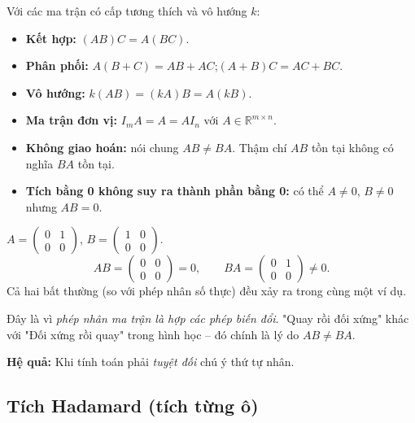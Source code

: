 \documentclass[12pt,a4paper]{article}
\begin{document}
\begin{tinhchat}[title={Tính chất phép nhân ma trận}]
Với các ma trận có cấp tương thích và vô hướng $k$:
\begin{itemize}
  \item \textbf{Kết hợp:} $(AB)C = A(BC)$.
  \item \textbf{Phân phối:} $A(B + C) = AB + AC$;\quad $(A+B)C = AC + BC$.
  \item \textbf{Vô hướng:} $k(AB) = (kA)B = A(kB)$.
  \item \textbf{Ma trận đơn vị:} $I_m A = A = A I_n$ với $A \in \mathbb{R}^{m \times n}$.
  \item \textbf{Không giao hoán:} nói chung $AB \ne BA$. Thậm chí $AB$ tồn tại không có nghĩa $BA$ tồn tại.
  \item \textbf{Tích bằng 0 không suy ra thành phần bằng 0:} có thể $A \ne 0$, $B \ne 0$ nhưng $AB = 0$.
\end{itemize}
\end{tinhchat}

\begin{phanvidu}[title={$AB \ne BA$ và $AB = 0$ với $A,B$ khác 0}]
$A = \begin{pmatrix}0 & 1\\0&0\end{pmatrix}$, $B = \begin{pmatrix}1 & 0\\0&0\end{pmatrix}$.
\[
  AB = \begin{pmatrix}0 & 0\\0&0\end{pmatrix} = 0,\qquad BA = \begin{pmatrix}0 & 1\\0&0\end{pmatrix} \ne 0.
\]
Cả hai bất thường (so với phép nhân số thực) đều xảy ra trong cùng một ví dụ.
\end{phanvidu}

\begin{ynghia}[title={Tại sao phép nhân ma trận không giao hoán?}]
Đây là vì \emph{phép nhân ma trận là hợp các phép biến đổi}. "Quay rồi đối xứng" khác với "Đối xứng rồi quay" trong hình học -- đó chính là lý do $AB \ne BA$.

\textbf{Hệ quả:} Khi tính toán phải \emph{tuyệt đối} chú ý thứ tự nhân.
\end{ynghia}

\subsection{Tích Hadamard (tích từng ô)}
\end{document}
